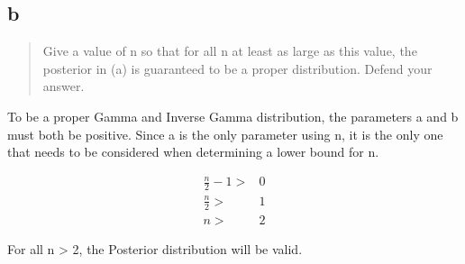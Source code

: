 \documentclass[11pt]{article}
\begin{document}
\subsection{b}
\label{sec:orgfb8692b}

\begin{quote}
Give a value of n so that for all n at least as large as this value, the
posterior in (a) is guaranteed to be a proper distribution. Defend your answer.
\end{quote}

To be a proper Gamma and Inverse Gamma distribution, the parameters a and b must
both be positive. Since a is the only parameter using n, it is the only one that
needs to be considered when determining a lower bound for n.


\begin{equation}
\begin{split}
\frac{n}{2} - 1 > & 0\\
\frac{n}{2} > & 1\\
n > & 2
\end{split}
\end{equation}

For all n > 2, the Posterior distribution will be valid.
\end{document}
